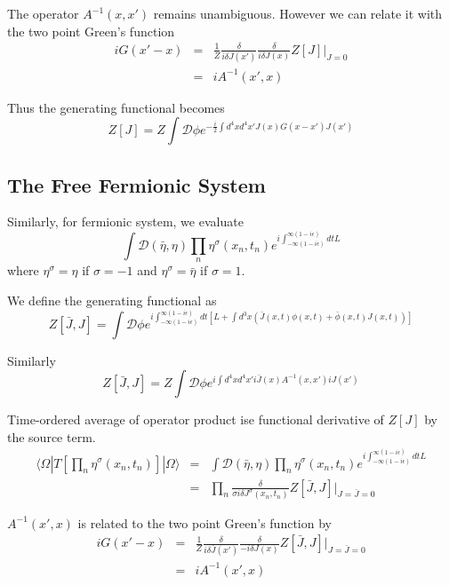 \documentclass[12pt]{book}
\begin{document}
	The operator $A^{-1}(x,x')$ remains unambiguous. However we can relate it with the two point Green's function
	\begin{eqnarray}
		iG(x'-x)&=&\frac 1Z\frac\delta{i\delta J(x')} \frac\delta{i\delta J(x)}Z[J]\Big|_{J=0}\\
		&=&iA^{-1}(x',x)
	\end{eqnarray}
	
	Thus the generating functional becomes
	\begin{equation}
		Z[J]=Z\int \mathcal D \phi e^{-\frac i2\int d^4xd^4x'J(x)G(x-x')J(x')}
	\end{equation}
	
	\subsection{The Free Fermionic System}
	
	Similarly, for fermionic system, we evaluate
	\begin{equation}
		\int \mathcal D(\bar\eta,\eta)\prod_n \eta^\sigma(x_n,t_n)e^{i\int_{-\infty(1-i\epsilon)}^{\infty(1-i\epsilon)}dtL}
	\end{equation}
	where $\eta^\sigma=\eta$ if $\sigma=-1$ and $\eta^\sigma=\bar\eta$ if $\sigma=1$.
	
	We define the generating functional as
	\begin{equation}
		Z[\bar J,J]=\int \mathcal D \phi e^{i\int_{-\infty(1-i\epsilon)}^{\infty(1-i\epsilon)}dt[L+\int d^3x(\bar J(x,t)\phi(x,t)+\bar \phi(x,t)J(x,t))]}
	\end{equation}
	
	Similarly
	\begin{equation}
		Z[\bar J,J]=Z\int \mathcal D \phi e^{i\int d^4xd^4x'i\bar J(x)A^{-1}(x,x')iJ(x')}
	\end{equation}
	
	Time-ordered average of operator product ise functional derivative of $Z[J]$ by the source term.
	\begin{eqnarray}
		\langle \Omega|T[\prod_n\eta^\sigma(x_n,t_n)]|\Omega\rangle&=&\int \mathcal D(\bar\eta,\eta)\prod_n \eta^\sigma(x_n,t_n)e^{i\int_{-\infty(1-i\epsilon)}^{\infty(1-i\epsilon)}dtL}\\
		&=&\prod_n \frac\delta{\sigma i\delta J^\sigma(x_n,t_n)}Z[\bar J,J]\Big|_{J=\bar J=0}
	\end{eqnarray}
	
	$A^{-1}(x',x)$ is related to the two point Green's function by
	\begin{eqnarray}
		iG(x'-x)&=&\frac 1Z\frac\delta{i\delta \bar J(x')} \frac\delta{-i\delta J(x)}Z[\bar J,J]\Big|_{J=\bar J=0}\\
		&=&iA^{-1}(x',x)
	\end{eqnarray}
	
\end{document}

